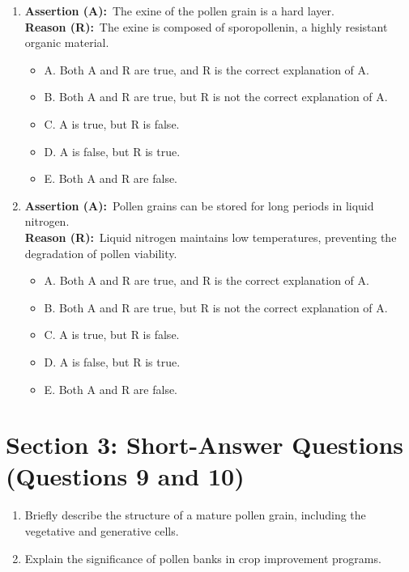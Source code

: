 \documentclass{article}
\begin{document}
\begin{enumerate}
    \item \textbf{Assertion (A):}\ The exine of the pollen grain is a hard layer. \\
    \textbf{Reason (R):}\ The exine is composed of sporopollenin, a highly resistant organic material.
        \begin{itemize}
            \item A. Both A and R are true, and R is the correct explanation of A.
            \item B. Both A and R are true, but R is not the correct explanation of A.
            \item C. A is true, but R is false.
            \item D. A is false, but R is true.
            \item E. Both A and R are false.
        \end{itemize}
    \item \textbf{Assertion (A):}\ Pollen grains can be stored for long periods in liquid nitrogen. \\
    \textbf{Reason (R):}\  Liquid nitrogen maintains low temperatures, preventing the degradation of pollen viability.
        \begin{itemize}
            \item A. Both A and R are true, and R is the correct explanation of A.
            \item B. Both A and R are true, but R is not the correct explanation of A.
            \item C. A is true, but R is false.
            \item D. A is false, but R is true.
            \item E. Both A and R are false.
        \end{itemize}
\end{enumerate}


\section*{Section 3: Short-Answer Questions (Questions 9 and 10)}

\begin{enumerate}
    \item Briefly describe the structure of a mature pollen grain, including the vegetative and generative cells.
    \item Explain the significance of pollen banks in crop improvement programs.
\end{enumerate}
\end{document}
